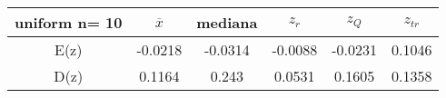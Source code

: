 \begin{tabular}{|c|c|c|c|c|c|}
\hline
uniform n= 10& $\overline{x}$ & mediana & $z_r$ & $z_Q$ & $z_{tr}$ \\ \hline
E(z) & -0.0218 & -0.0314 & -0.0088 & -0.0231 & 0.1046 \\ \hline
D(z) & 0.1164 & 0.243 & 0.0531 & 0.1605 & 0.1358 \\ \hline
\end{tabular}